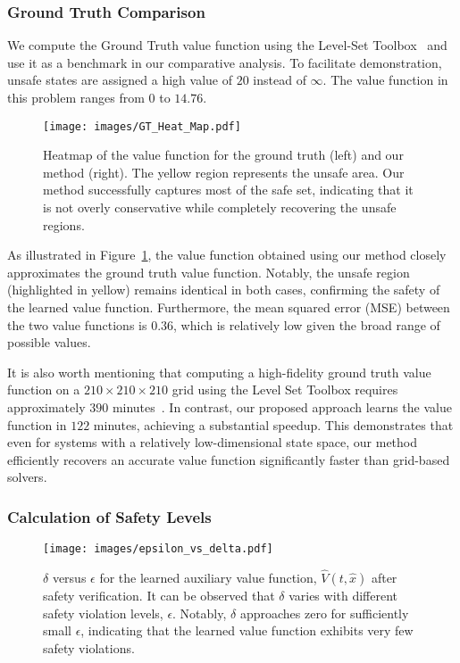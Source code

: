 \subsubsection{Ground Truth Comparison}\label{Appendix: GT_comp}
We compute the Ground Truth value function using the Level-Set Toolbox~\cite{mitchell2004toolbox} and use it as a benchmark in our comparative analysis. To facilitate demonstration, unsafe states are assigned a high value of $20$ instead of $\infty$. The value function in this problem ranges from $0$ to $14.76$.

\begin{figure}[h]
\centering
\texttt{[image: images/GT\_Heat\_Map.pdf]}
\caption{Heatmap of the value function for the ground truth (left) and our method (right). The yellow region represents the unsafe area. Our method successfully captures most of the safe set, indicating that it is not overly conservative while completely recovering the unsafe regions.}
\label{fig: GT Comparison}
\end{figure}

As illustrated in Figure~\ref{fig: GT Comparison}, the value function obtained using our method closely approximates the ground truth value function. Notably, the unsafe region (highlighted in yellow) remains identical in both cases, confirming the safety of the learned value function. Furthermore, the mean squared error (MSE) between the two value functions is $0.36$, which is relatively low given the broad range of possible values. 

It is also worth mentioning that computing a high-fidelity ground truth value function on a $210 \times 210 \times 210$ grid using the Level Set Toolbox requires approximately $390$ minutes~\cite{10777061}. In contrast, our proposed approach learns the value function in $122$ minutes, achieving a substantial speedup. This demonstrates that even for systems with a relatively low-dimensional state space, our method efficiently recovers an accurate value function significantly faster than grid-based solvers.

\subsubsection{Calculation of Safety Levels}
\begin{figure}[h]
\centering
\texttt{[image: images/epsilon\_vs\_delta.pdf]}
\vspace{-1em}
\caption{$\delta$ versus $\epsilon$ for the learned auxiliary value function, $\hat{V}(t, \hat{x})$ after safety verification. It can be observed that $\delta$ varies with different safety violation levels, $\epsilon$. Notably, $\delta$ approaches zero for sufficiently small $\epsilon$, indicating that the learned value function exhibits very few safety violations.}
\label{fig: Delta_vs_Epsilon}
\end{figure}

